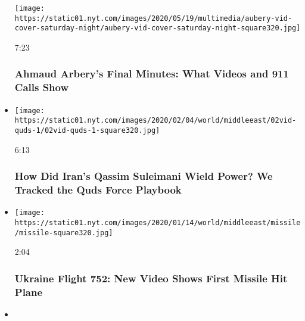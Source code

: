 \begin{itemize}
  \texttt{[image: https://static01.nyt.com/images/2020/05/19/multimedia/aubery-vid-cover-saturday-night/aubery-vid-cover-saturday-night-square320.jpg]}

  7:23

  \hypertarget{ahmaud-arberys-final-minutes-what-videos-and-911-calls-show}{%
  \subsubsection{Ahmaud Arbery's Final Minutes: What Videos and 911
  Calls
  Show}\label{ahmaud-arberys-final-minutes-what-videos-and-911-calls-show}}
\item
  \href{https://www.nytimes.com/video/world/middleeast/100000006906161/suleimani-quds-iran.html?action=click\&module=video-series-bar\&region=header\&pgtype=Article\&playlistId=video/investigations}{}

  \texttt{[image: https://static01.nyt.com/images/2020/02/04/world/middleeast/02vid-quds-1/02vid-quds-1-square320.jpg]}

  6:13

  \hypertarget{how-did-irans-qassim-suleimani-wield-power-we-tracked-the-quds-force-playbook}{%
  \subsubsection{How Did Iran's Qassim Suleimani Wield Power? We Tracked
  the Quds Force
  Playbook}\label{how-did-irans-qassim-suleimani-wield-power-we-tracked-the-quds-force-playbook}}
\item
  \href{https://www.nytimes.com/video/world/middleeast/100000006920114/iran-plane-missile-video.html?action=click\&module=video-series-bar\&region=header\&pgtype=Article\&playlistId=video/investigations}{}

  \texttt{[image: https://static01.nyt.com/images/2020/01/14/world/middleeast/missile/missile-square320.jpg]}

  2:04

  \hypertarget{ukraine-flight-752-new-video-shows-first-missile-hit-plane}{%
  \subsubsection{Ukraine Flight 752: New Video Shows First Missile Hit
  Plane}\label{ukraine-flight-752-new-video-shows-first-missile-hit-plane}}
\item
  \href{https://www.nytimes.com/video/world/middleeast/100000006911696/iran-crash.html?action=click\&module=video-series-bar\&region=header\&pgtype=Article\&playlistId=video/investigations}{}


\end{itemize}
